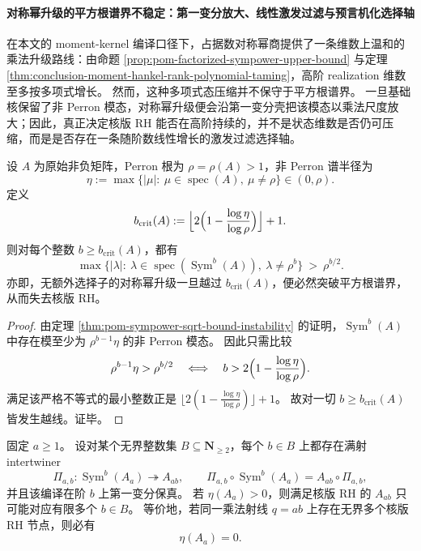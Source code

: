 \paragraph{对称幂升级的平方根谱界不稳定：第一变分放大、线性激发过滤与预言机化选择轴}
在本文的 moment-kernel 编译口径下，占据数对称幂商提供了一条维数上温和的乘法升级路线：由命题 \ref{prop:pom-factorized-sympower-upper-bound} 与定理 \ref{thm:conclusion-moment-hankel-rank-polynomial-taming}，高阶 realization 维数至多按多项式增长。
然而，这种多项式态压缩并不保守于平方根谱界。
一旦基础核保留了非 Perron 模态，对称幂升级便会沿第一变分壳把该模态以乘法尺度放大；因此，真正决定核版 RH 能否在高阶持续的，并不是状态维数是否仍可压缩，而是是否存在一条随阶数线性增长的激发过滤选择轴。

\begin{theorem}[对称幂失稳的显式临界阶只由谱比决定]\label{thm:conclusion-sympower-explicit-critical-order}
设 \(A\) 为原始非负矩阵，Perron 根为 \(\rho=\rho(A)>1\)，非 Perron 谱半径为
\[
\eta:=\max\{|\mu|:\ \mu\in\operatorname{spec}(A),\ \mu\neq \rho\}\in(0,\rho).
\]
定义
\[
b_{\mathrm{crit}}(A):=
\Bigl\lfloor 2\Bigl(1-\frac{\log \eta}{\log \rho}\Bigr)\Bigr\rfloor+1.
\]
则对每个整数 \(b\ge b_{\mathrm{crit}}(A)\)，都有
\[
\max\bigl\{|\lambda|:\ \lambda\in\operatorname{spec}(\operatorname{Sym}^b(A)),\ \lambda\neq \rho^b\bigr\}
\ >\
\rho^{b/2}.
\]
亦即，无额外选择子的对称幂升级一旦越过 \(b_{\mathrm{crit}}(A)\)，便必然突破平方根谱界，从而失去核版 RH。
\end{theorem}

\begin{proof}
由定理 \ref{thm:pom-sympower-sqrt-bound-instability} 的证明，\(\operatorname{Sym}^b(A)\) 中存在模至少为 \(\rho^{b-1}\eta\) 的非 Perron 模态。
因此只需比较
\[
\rho^{b-1}\eta>\rho^{b/2}
\quad\Longleftrightarrow\quad
b>2\Bigl(1-\frac{\log\eta}{\log\rho}\Bigr).
\]
满足该严格不等式的最小整数正是
\(
\lfloor 2(1-\frac{\log\eta}{\log\rho})\rfloor+1
\)。
故对一切 \(b\ge b_{\mathrm{crit}}(A)\) 皆发生越线。证毕。
\end{proof}

\begin{corollary}\label{cor:conclusion-kernel-rh-only-finitely-often-on-fixed-ray}
固定 \(a\ge 1\)。
设对某个无界整数集 \(B\subseteq \mathbf N_{\ge 2}\)，每个 \(b\in B\) 上都存在满射 intertwiner
\[
\Pi_{a,b}:\operatorname{Sym}^b(A_a)\twoheadrightarrow A_{ab},
\qquad
\Pi_{a,b}\circ \operatorname{Sym}^b(A_a)=A_{ab}\circ \Pi_{a,b},
\]
并且该编译在阶 \(b\) 上第一变分保真。
若 \(\eta(A_a)>0\)，则满足核版 RH 的 \(A_{ab}\) 只可能对应有限多个 \(b\in B\)。
等价地，若同一乘法射线 \(q=ab\) 上存在无界多个核版 RH 节点，则必有
\[
\eta(A_a)=0.
\]
\end{corollary}

